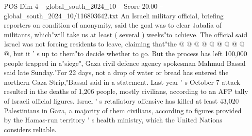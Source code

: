 \begin{textsample}{POS Dim 4 – global\_south\_2024\_10 – Score 20.00 – global\_south\_2024\_10/116803642.txt}
An Israeli military official, briefing reporters on condition of anonymity, said the goal was to clear Jabalia of militants, which"will take us at least ( several ) weeks"to achieve.
The official said Israel was not forcing residents to leave, claiming that"the @ @ @ @ @ @ @ @ @ @, but it ' s up to them"to decide whether to go.
But the process has left 100,000 people trapped in a"siege", Gaza civil defence agency spokesman Mahmud Bassal said late Sunday."For 22 days, not a drop of water or bread has entered the northern Gaza Strip,"Bassal said in a statement.
Last year ' s October 7 attack resulted in the deaths of 1,206 people, mostly civilians, according to an AFP tally of Israeli official figures.
Israel ' s retaliatory offensive has killed at least 43,020 Palestinians in Gaza, a majority of them civilians, according to figures provided by the Hamas-run territory ' s health ministry, which the United Nations considers reliable.

\end{textsample}
